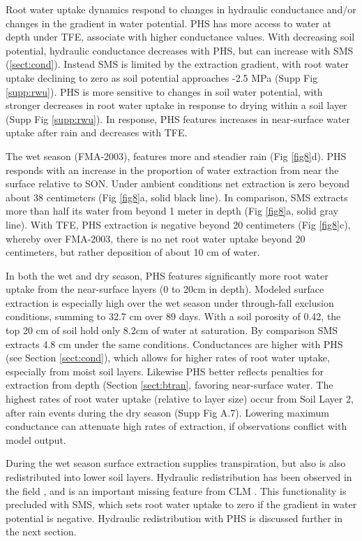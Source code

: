 \documentclass[draft,linenumbers]{agujournal}
\begin{document}
    Root water uptake dynamics respond to changes in hydraulic conductance and/or changes in the gradient in water potential.
    PHS has more access to water at depth under TFE, associate with higher conductance values.
    With decreasing soil potential, hydraulic conductance decreases with PHS, but can increase with SMS (\ref{sect:cond}).
    Instead SMS is limited by the extraction gradient, with root water uptake declining to zero as soil potential approaches -2.5 MPa (Supp Fig \ref{supp:rwu}).
    PHS is more sensitive to changes in soil water potential, with stronger decreases in root water uptake in response to drying within a soil layer (Supp Fig \ref{supp:rwu}).
    In response, PHS features increases in near-surface water uptake after rain and decreases with TFE.

    The wet season (FMA-2003), features more and steadier rain (Fig \ref{fig8}d).
    PHS responds with an increase in the proportion of water extraction from near the surface relative to SON.
    Under ambient conditions net extraction is zero beyond about 38 centimeters (Fig \ref{fig8}a, solid black line).
    In comparison, SMS extracts more than half its water from beyond 1 meter in depth (Fig \ref{fig8}a, solid gray line).
    With TFE, PHS extraction is negative beyond 20 centimeters (Fig \ref{fig8}c), whereby over FMA-2003,
    there is no net root water uptake beyond 20 centimeters, but rather deposition of about 10 cm of water.
    
    In both the wet and dry season, PHS features significantly more root water uptake from the near-surface layers (0 to 20cm in depth). 
    Modeled surface extraction is especially high over the wet season under through-fall exclusion conditions, summing to 32.7 cm over 89 days.
    With a soil porosity of 0.42, the top 20 cm of soil hold only 8.2cm of water at saturation.
    By comparison SMS extracts 4.8 cm under the same conditions.
    Conductances are higher with PHS (see Section \ref{sect:cond}), which allows for higher rates of root water uptake, especially from moist soil layers.
    Likewise PHS better reflects penalties for extraction from depth (Section \ref{sect:btran}, favoring near-surface water.
    The highest rates of root water uptake (relative to layer size) occur from Soil Layer 2, after rain events during the dry season (Supp Fig A.7).
    Lowering maximum conductance can attenuate high rates of extraction, if observations conflict with model output.

    During the wet season surface extraction supplies transpiration, but also is also redistributed into lower soil layers. 
    Hydraulic redistribution has been observed in the field \citep{oliveira2005}, and is an important missing feature from CLM \citep{lee2005}.
    This functionality is precluded with SMS, which sets root water uptake to zero if the gradient in water potential is negative. 
    Hydraulic redistribution with PHS is discussed further in the next section.
\end{document}
